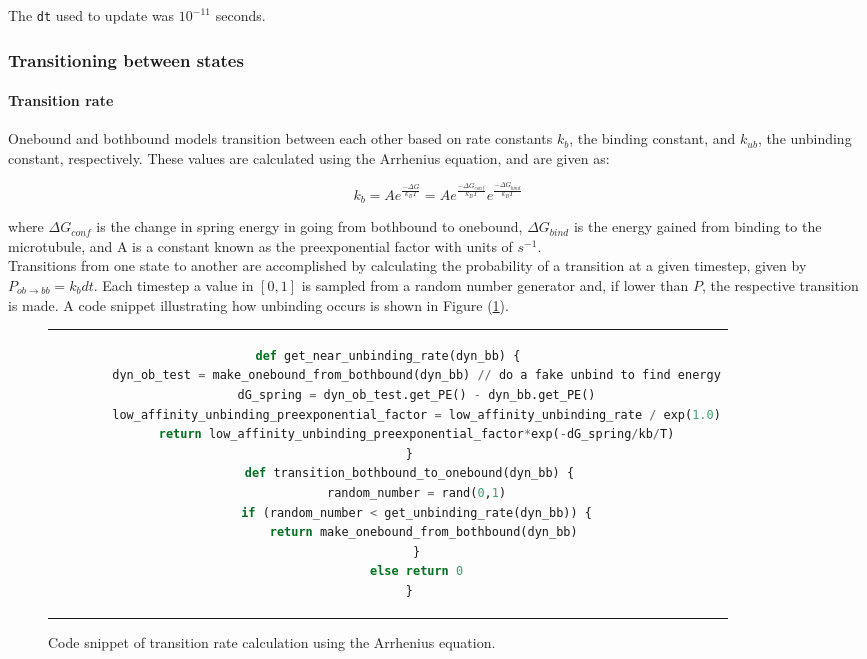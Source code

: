\documentclass[10pt]{article} %
\begin{document}
The \verb|dt| used to update was $10^{-11}$ seconds.

\subsubsection{Transitioning between states}

\paragraph{Transition rate}
\label{sec:transitioning-states}
Onebound and bothbound models transition between each other based on rate constants $k_b$, the binding constant, and $k_{ub}$, the unbinding constant, respectively. These values are calculated using the Arrhenius equation, and are given as:

\begin{equation}
  k_b = Ae^{\frac{-\Delta G}{k_BT}} = Ae^{\frac{-\Delta G_{conf}}{k_BT}}e^{\frac{-\Delta G_{bind}}{k_BT}}
\end{equation}

where $\Delta G_{conf}$ is the change in spring energy in going from bothbound to onebound, $\Delta G_{bind}$ is the energy gained from binding to the microtubule, and A is a constant known as the preexponential factor with units of $s^{-1}$.\\

Transitions from one state to another are accomplished by calculating the probability of a transition at a given timestep, given by $P_{ob\rightarrow bb} = k_bdt$. Each timestep a value in $[0,1]$ is sampled from a random number generator and, if lower than $P$, the respective transition is made. A code snippet illustrating how unbinding occurs is shown in Figure (\ref{transition-rate-snippet}).

\begin{figure}[h!]
  \begin{tabular}{c}
    \begin{lstlisting}[language=python]
      def get_near_unbinding_rate(dyn_bb) {
        dyn_ob_test = make_onebound_from_bothbound(dyn_bb) // do a fake unbind to find energy
        dG_spring = dyn_ob_test.get_PE() - dyn_bb.get_PE()
        low_affinity_unbinding_preexponential_factor = low_affinity_unbinding_rate / exp(1.0)
        return low_affinity_unbinding_preexponential_factor*exp(-dG_spring/kb/T)
      }
      def transition_bothbound_to_onebound(dyn_bb) {
        random_number = rand(0,1)
        if (random_number < get_unbinding_rate(dyn_bb)) {
          return make_onebound_from_bothbound(dyn_bb)
        }
        else return 0
      }
    \end{lstlisting}
  \end{tabular}
  \caption{Code snippet of transition rate calculation using the Arrhenius equation.}
  \label{transition-rate-snippet}
\end{figure}
\end{document}
